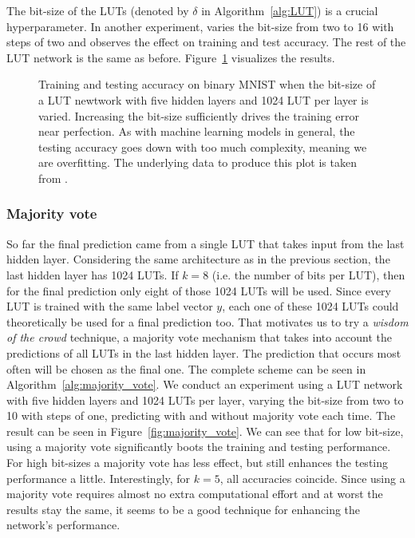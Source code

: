 The bit-size of the LUTs (denoted by $\delta$ in Algorithm~\ref{alg:LUT}) is a crucial hyperparameter. In another experiment, \cite{chatterjee2018learning} varies the bit-size from two to 16 with steps of two and observes the effect on training and test accuracy. The rest of the LUT network is the same as before. Figure~\ref{fig:ex1_k_acc} visualizes the results.

\begin{figure}[!htb]
    \centering
    
    \caption{Training and testing accuracy on binary MNIST when the bit-size of a LUT newtwork with five hidden layers and 1024 LUT per layer is varied. Increasing the bit-size sufficiently drives the training error near perfection. As with machine learning models in general, the testing accuracy goes down with too much complexity, meaning we are overfitting. The underlying data to produce this plot is taken from \cite{chatterjee2018learning}.}
\label{fig:ex1_k_acc}
\end{figure}
\FloatBarrier

\subsubsection{Majority vote} \label{sec:majority_vote}
So far the final prediction came from a single LUT that takes input from the last hidden layer. Considering the same architecture as in the previous section, the last hidden layer has 1024 LUTs. If $k=8$ (i.e. the number of bits per LUT), then for the final prediction only eight of those 1024 LUTs will be used. Since every LUT is trained with the same label vector $y$, each one of these 1024 LUTs could theoretically be used for a final prediction too. That motivates us to try a \textit{wisdom of the crowd} technique, a majority vote mechanism that takes into account the predictions of all LUTs in the last hidden layer. The prediction that occurs most often will be chosen as the final one. The complete scheme can be seen in Algorithm~\ref{alg:majority_vote}. We conduct an experiment using a LUT network with five hidden layers and 1024 LUTs per layer, varying the bit-size from two to 10 with steps of one, predicting with and without majority vote each time. The result can be seen in Figure~\ref{fig:majority_vote}. We can see that for low bit-size, using a majority vote significantly boots the training and testing performance. For high bit-sizes a majority vote has less effect, but still enhances the testing performance a little. Interestingly, for $k=5$, all accuracies coincide. Since using a majority vote requires almost no extra computational effort and at worst the results stay the same, it seems to be a good technique for enhancing the network's performance.

